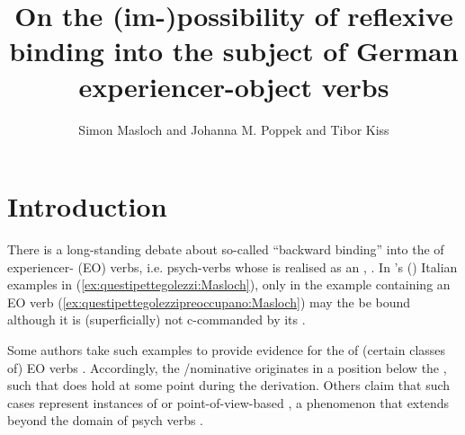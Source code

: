 \documentclass[output=paper,colorlinks,citecolor=brown]{langscibook}
\author{Simon Masloch\orcid{0000-0002-9292-4395}\affiliation{Ruhr-University Bochum} and         Johanna M. Poppek\orcid{0000-0003-0353-1109}\affiliation{Ruhr-University Bochum} and         Tibor Kiss\orcid{0000-0003-1857-3686}\affiliation{Ruhr-University Bochum}}
\title[Reflexive binding into the subject of German experiencer-object verbs]{On the (im-)possibility of reflexive binding into the subject of German experiencer-object verbs}
\begin{document}
\maketitle

\section{Introduction}
\label{sec:introduction:Masloch}

There is a long-standing debate about so-called \enquote{backward binding} into the  of experiencer- (EO) verbs, i.e. psych-verbs whose  is realised as an , \citep[see i.a.][]{belletti_psych-verbs_1988,pollard_anaphors_1992,pesetsky_zero_1995,landau_locative_2010,cheung_psych_2015}.
In \citeauthor{belletti_psych-verbs_1988}'s (\citeyear{belletti_psych-verbs_1988}) Italian examples in (\ref{ex:questipettegolezzi:Masloch}), only in the example containing an EO verb (\ref{ex:questipettegolezzipreoccupano:Masloch}) may the  be bound although it is (superficially) not c-commanded by its .


Some authors take such examples to provide evidence for the  of (certain classes of) EO verbs \citep[e.g.][]{belletti_psych-verbs_1988,cheung_psych_2015}. Accordingly, the /nominative originates in a position below the , such that  does hold at some point during the derivation. Others claim that such cases represent instances of  or point-of-view-based , a phenomenon that extends beyond the domain of psych verbs \citep[e.g.][]{pollard_anaphors_1992,bouchard_semantics_1995}.
\end{document}
